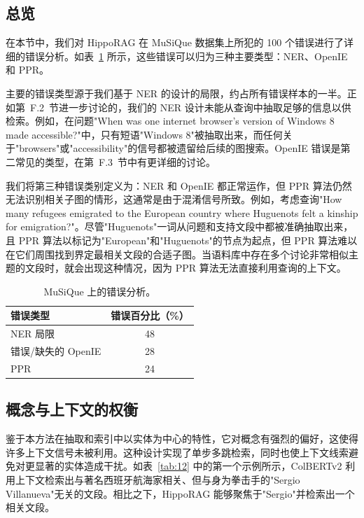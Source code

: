 \documentclass[11pt,UTF8,fontset=fandol]{ctexart}
\begin{document}
\subsection{总览}

在本节中，我们对 HippoRAG 在 MuSiQue 数据集上所犯的 100 个错误进行了详细的错误分析。如表~\ref{tab:11} 所示，这些错误可以归为三种主要类型：NER、OpenIE 和 PPR。

主要的错误类型源于我们基于 NER 的设计的局限，约占所有错误样本的一半。正如第~F.2~节进一步讨论的，我们的 NER 设计未能从查询中抽取足够的信息以供检索。例如，在问题"When was one internet browser's version of Windows 8 made accessible?"中，只有短语"Windows 8"被抽取出来，而任何关于"browsers"或"accessibility"的信号都被遗留给后续的图搜索。OpenIE 错误是第二常见的类型，在第~F.3~节中有更详细的讨论。

我们将第三种错误类别定义为：NER 和 OpenIE 都正常运作，但 PPR 算法仍然无法识别相关子图的情形，这通常是由于混淆信号所致。例如，考虑查询"How many refugees emigrated to the European country where Huguenots felt a kinship for emigration?"。尽管"Huguenots"一词从问题和支持文段中都被准确抽取出来，且 PPR 算法以标记为"European"和"Huguenots"的节点为起点，但 PPR 算法难以在它们周围找到界定最相关文段的合适子图。当语料库中存在多个讨论非常相似主题的文段时，就会出现这种情况，因为 PPR 算法无法直接利用查询的上下文。

\begin{table}[H]\centering
\caption{MuSiQue 上的错误分析。}
\label{tab:11}
\begin{tabular}{lc}
\toprule
错误类型 & 错误百分比（\%） \\
\midrule
NER 局限 & 48 \\
错误/缺失的 OpenIE & 28 \\
PPR & 24 \\
\bottomrule
\end{tabular}
\end{table}

\subsection{概念与上下文的权衡}

鉴于本方法在抽取和索引中以实体为中心的特性，它对概念有强烈的偏好，这使得许多上下文信号未被利用。这种设计实现了单步多跳检索，同时也使上下文线索避免对更显著的实体造成干扰。如表~\ref{tab:12} 中的第一个示例所示，ColBERTv2 利用上下文检索出与著名西班牙航海家相关、但与身为拳击手的"Sergio Villanueva"无关的文段。相比之下，HippoRAG 能够聚焦于"Sergio"并检索出一个相关文段。
\end{document}
